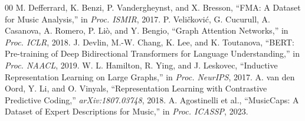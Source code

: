 \documentclass[conference]{IEEEtran}
\begin{document}
\begin{thebibliography}{00}
 M. Defferrard, K. Benzi, P. Vandergheynst, and X. Bresson, ``FMA: A Dataset for Music Analysis,'' in \textit{Proc. ISMIR}, 2017.
 P. Veli\v{c}kovi\'c, G. Cucurull, A. Casanova, A. Romero, P. Li\`o, and Y. Bengio, ``Graph Attention Networks,'' in \textit{Proc. ICLR}, 2018.
 J. Devlin, M.-W. Chang, K. Lee, and K. Toutanova, ``BERT: Pre-training of Deep Bidirectional Transformers for Language Understanding,'' in \textit{Proc. NAACL}, 2019.
 W. L. Hamilton, R. Ying, and J. Leskovec, ``Inductive Representation Learning on Large Graphs,'' in \textit{Proc. NeurIPS}, 2017.
 A. van den Oord, Y. Li, and O. Vinyals, ``Representation Learning with Contrastive Predictive Coding,'' \textit{arXiv:1807.03748}, 2018.
 A. Agostinelli et al., ``MusicCaps: A Dataset of Expert Descriptions for Music,'' in \textit{Proc. ICASSP}, 2023.
\end{thebibliography}
\end{document}
